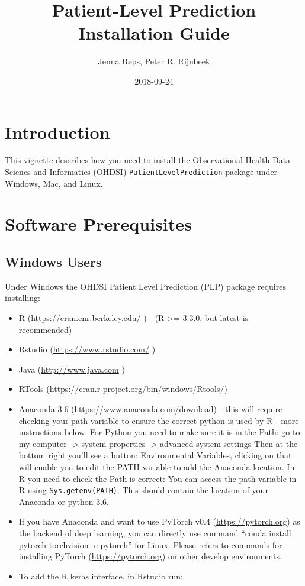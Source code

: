 \documentclass[]{article}
\title{Patient-Level Prediction Installation Guide}
\author{Jenna Reps, Peter R. Rijnbeek}
\date{2018-09-24}
\providecommand{\tightlist}{%
  \setlength{\itemsep}{0pt}\setlength{\parskip}{0pt}}
\begin{document}
\maketitle

{
\setcounter{tocdepth}{2}
\tableofcontents
}
\section{Introduction}\label{introduction}

This vignette describes how you need to install the Observational Health
Data Sciencs and Informatics (OHDSI)
\href{http://github.com/OHDSI/PatientLevelPrediction}{\texttt{PatientLevelPrediction}}
package under Windows, Mac, and Linux.

\section{Software Prerequisites}\label{software-prerequisites}

\subsection{Windows Users}\label{windows-users}

Under Windows the OHDSI Patient Level Prediction (PLP) package requires
installing:

\begin{itemize}
\tightlist
\item
  R (\url{https://cran.cnr.berkeley.edu/} ) - (R \textgreater{}= 3.3.0,
  but latest is recommended)
\item
  Rstudio (\url{https://www.rstudio.com/} )
\item
  Java (\url{http://www.java.com} )
\item
  RTools (\url{https://cran.r-project.org/bin/windows/Rtools/})
\item
  Anaconda 3.6 (\url{https://www.anaconda.com/download}) - this will
  require checking your path variable to ensure the correct python is
  used by R - more instructions below. For Python you need to make sure
  it is in the Path: go to my computer -\textgreater{} system properties
  -\textgreater{} advanced system settings Then at the bottom right
  you'll see a button: Environmental Variables, clicking on that will
  enable you to edit the PATH variable to add the Anaconda location. In
  R you need to check the Path is correct: You can access the path
  variable in R using
  \texttt{Sys.getenv(\textquotesingle{}PATH\textquotesingle{})}. This
  should contain the location of your Anaconda or python 3.6.
\item
  If you have Anaconda and want to use PyTorch v0.4
  (\url{https://pytorch.org}) as the backend of deep learning, you can
  directly use command ``conda install pytorch torchvision -c pytorch''
  for Linux. Please refers to commands for installing PyTorch
  (\url{https://pytorch.org}) on other develop environments.
\item
  To add the R keras interface, in Rstudio run:
\end{itemize}
\end{document}
